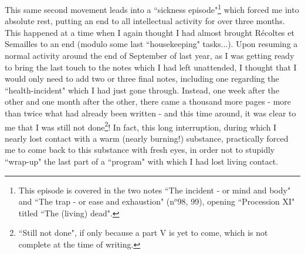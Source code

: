 This same second movement leads into a ``sickness episode"\footnote{This episode is covered in the two notes ``The incident - or mind and body" and ``The trap - or ease and exhaustion" (n$^o$98, 99), opening ``Procession XI" titled ``The (living) dead".} which forced me into absolute rest, putting an end to all intellectual activity for over three months. This happened at a time when I again thought I had almost brought R\'ecoltes et Semailles to an end (modulo some last ``housekeeping" tasks...). Upon resuming a normal activity around the end of September of last year, as I was getting ready to bring the last touch to the notes which I had left unattended, I thought that I would only need to add two or three final notes, including one regarding the ``health-incident" which I had just gone through. Instead, one week after the other and one month after the other, there came a thousand more pages - more than twice what had already been written - and this time around, it was clear to me that I was still not done\footnote{``Still not done", if only because a part V is yet to come, which is not complete at the time of writing.}! In fact, this long interruption, during which I nearly lost contact with a warm (nearly burning!) substance, practically forced me to come back to this substance with fresh eyes, in order not to stupidly ``wrap-up" the last part of a ``program" with which I had lost living contact.

